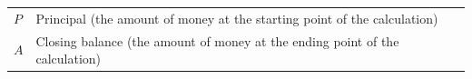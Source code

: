 \begin{itemize}[noitemsep]
{    %
    
        \begin{center}
      
      \label{m39335*id75382}
      
    \noindent
      \tablelasttail{}
      \begin{xtabular*}{\mytablewidth}[t]{|p{10\mystarwidth}|p{10\mystarwidth}|}\hline
    
    
        
                  \begin{math}P\end{math}
                 &
    
    
        Principal (the amount of money at the starting point of the calculation)%
     \tabularnewline{}
    
    
        
                  \begin{math}A\end{math}
                 &
    
    
        Closing balance (the amount of money at the ending point of the calculation)%
     \tabularnewline{}
    

\end{xtabular*}
\end{center}}
\end{itemize}
